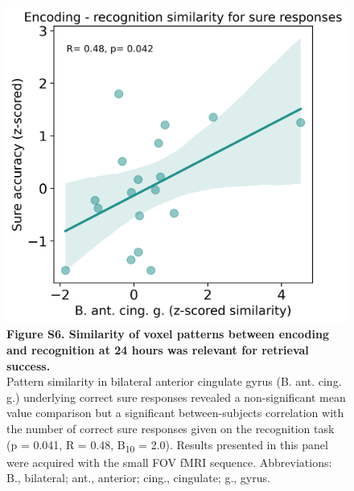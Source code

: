  \begin{figure}[!ht]
    \centering
     \includegraphics[width=\linewidth/2]{paper/src/figures/20240710_wb-all_memory_n_enc_recog_perm_consc_consc-unconsc_incorr_B. ant. cing. g._ERS_correl.png}
     \caption*{\textbf{Figure S6. Similarity of voxel patterns between encoding and recognition at 24 hours was relevant for retrieval success.} \\ \vspace{0.5em}
 Pattern similarity in bilateral anterior cingulate gyrus (B. ant. cing. g.) underlying correct sure responses revealed a non-significant mean value comparison but a significant between-subjects correlation with the number of correct sure responses given on the recognition task (p = 0.041, R = 0.48, B\textsubscript{10} = 2.0).  Results presented in this panel were acquired with the small FOV fMRI sequence. Abbreviations: B., bilateral; ant., anterior; cing., cingulate; g., gyrus.}
\end{figure}

